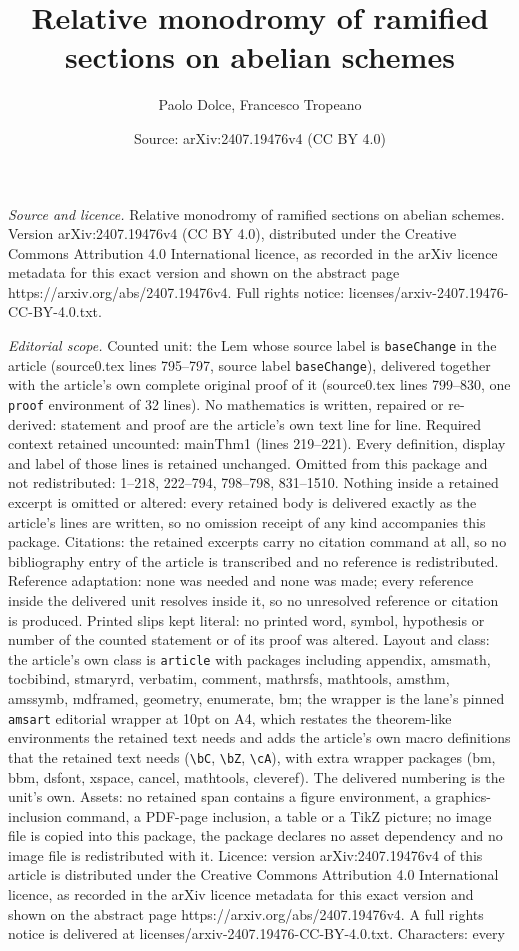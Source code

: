 \documentclass[10pt,a4paper]{amsart}
\title[Relative monodromy of ramified sections on abelian schemes]{Relative monodromy of ramified sections on abelian schemes}
\author{Paolo Dolce, Francesco Tropeano}
\date{Source: arXiv:2407.19476v4 (CC BY 4.0)}
\begin{document}
\maketitle

\noindent\emph{Source and licence.} Relative monodromy of ramified sections on abelian schemes. Version arXiv:2407.19476v4 (CC BY 4.0), distributed under the Creative Commons Attribution 4.0 International licence, as recorded in the arXiv licence metadata for this exact version and shown on the abstract page https://arxiv.org/abs/2407.19476v4. Full rights notice: licenses/arxiv-2407.19476-CC-BY-4.0.txt.\par\smallskip

\noindent\textit{Editorial scope.} Counted unit: the Lem whose source label is \texttt{baseChange} in the article (source0.tex lines 795--797, source label \texttt{baseChange}), delivered together with the article's own complete original proof of it (source0.tex lines 799--830, one \texttt{proof} environment of 32 lines). No mathematics is written, repaired or re-derived: statement and proof are the article's own text line for line. Required context retained uncounted: mainThm1 (lines 219--221). Every definition, display and label of those lines is retained unchanged. Omitted from this package and not redistributed: 1--218, 222--794, 798--798, 831--1510. Nothing inside a retained excerpt is omitted or altered: every retained body is delivered exactly as the article's lines are written, so no omission receipt of any kind accompanies this package. Citations: the retained excerpts carry no citation command at all, so no bibliography entry of the article is transcribed and no reference is redistributed. Reference adaptation: none was needed and none was made; every reference inside the delivered unit resolves inside it, so no unresolved reference or citation is produced. Printed slips kept literal: no printed word, symbol, hypothesis or number of the counted statement or of its proof was altered. Layout and class: the article's own class is \texttt{article} with packages including appendix, amsmath, tocbibind, stmaryrd, verbatim, comment, mathrsfs, mathtools, amsthm, amssymb, mdframed, geometry, enumerate, bm; the wrapper is the lane's pinned \texttt{amsart} editorial wrapper at 10pt on A4, which restates the theorem-like environments the retained text needs and adds the article's own macro definitions that the retained text needs (\texttt{\textbackslash bC}, \texttt{\textbackslash bZ}, \texttt{\textbackslash cA}), with extra wrapper packages (bm, bbm, dsfont, xspace, cancel, mathtools, cleveref). The delivered numbering is the unit's own. Assets: no retained span contains a figure environment, a graphics-inclusion command, a PDF-page inclusion, a table or a TikZ picture; no image file is copied into this package, the package declares no asset dependency and no image file is redistributed with it. Licence: version arXiv:2407.19476v4 of this article is distributed under the Creative Commons Attribution 4.0 International licence, as recorded in the arXiv licence metadata for this exact version and shown on the abstract page https://arxiv.org/abs/2407.19476v4. A full rights notice is delivered at licenses/arxiv-2407.19476-CC-BY-4.0.txt. Characters: every 
\end{document}
